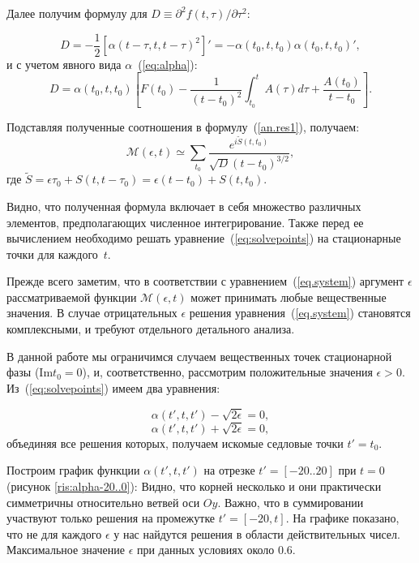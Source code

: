 \documentclass[14pt, a4paper]{article}
\numberwithin{figure}{section}
\numberwithin{equation}{section}
\renewcommand{\Im}{\mathrm{Im}}
\newcommand{\cM}{\mathcal{M}}
\begin{document}
Далее получим формулу для $D\equiv\partial^2 f(t, \tau)/\partial\tau^2$:

$$
D = -\frac{1}{2}\left[\alpha(t-\tau, t, t-\tau)^2\right]' = 
-\alpha(t_0, t, t_0) \alpha(t_0, t, t_0)',
$$
и с учетом явного вида $\alpha$~(\ref{eq:alpha}):
\begin{equation*}
D = \alpha(t_0, t, t_0)\left[F(t_0) - \frac{1}{(t - t_0)^2} \int_{t_0}^{t}A(\tau)d\tau +  \frac{A(t_0)}{t-t_0} \right].
\end{equation*}

Подставляя полученные соотношения в формулу~(\ref{an.res1}), получаем:
\begin{equation}\label{eq:out}
\cM(\epsilon, t) \simeq \sum_{t_0}\frac{e^{i\widetilde{S}(t, t_0)} }{\sqrt{D} (t-t_0)^{3/2}},
\end{equation}
где $\widetilde{S} = \epsilon \tau_0 + S(t, t-\tau_0) = \epsilon(t-t_0) + S(t, t_0)$.

Видно, что полученная формула включает в себя множество различных элементов, предполагающих численное интегрирование. Также перед ее вычислением необходимо решать уравнение~(\ref{eq:solvepoints}) на стационарные точки для каждого~$t$.

Прежде всего заметим, что в соответствии с уравнением~(\ref{eq.system}) аргумент $\epsilon$ рассматриваемой функции $\cM(\epsilon,t)$ может принимать любые вещественные значения.
В случае отрицательных $\epsilon$ решения уравнения~(\ref{eq.system}) становятся комплексными, и требуют отдельного детального анализа. 

В данной работе мы ограничимся случаем вещественных точек стационарной фазы ($\Im t_0=0$), и, соответственно, рассмотрим положительные значения $\epsilon>0$.
Из~(\ref{eq:solvepoints}) имеем два уравнения:

$$\alpha(t', t, t') - \sqrt{2\epsilon} = 0,$$
$$\alpha(t', t, t') + \sqrt{2\epsilon} = 0,$$
объединяя все решения которых, получаем искомые седловые точки $t'=t_0$.

Построим график функции $\alpha(t', t, t')$ на отрезке $t' = [-20..20]$ при $t = 0$ (рисунок \ref{ris:alpha-20..0}):
Видно, что корней несколько и они практически симметричны относительно ветвей оси $O y$. Важно, что в суммировании участвуют только решения на промежутке $t' = [-20, t]$. 
На графике показано, что не для каждого $\epsilon$ у нас найдутся решения в области действительных чисел. Максимальное значение $\epsilon$ при данных условиях около 0.6.
\end{document}
